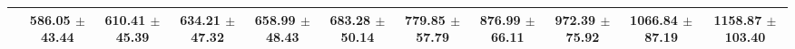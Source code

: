 {\begin{center}
\begin{small}
\begin{tabular}{ccccccccccc}
 & \textcolor{myred}{586.05 $\pm$ 43.44} & \textcolor{myred}{610.41 $\pm$ 45.39} & \textcolor{myred}{634.21 $\pm$ 47.32} & \textcolor{myred}{658.99 $\pm$ 48.43} & \textcolor{myred}{683.28 $\pm$ 50.14} & \textcolor{myred}{779.85 $\pm$ 57.79} & \textcolor{myred}{876.99 $\pm$ 66.11} & \textcolor{myred}{972.39 $\pm$ 75.92} & \textcolor{myred}{1066.84 $\pm$ 87.19} & \textcolor{myred}{1158.87 $\pm$ 103.40} \\
\hline\hline
\end{tabular}
\end{small}
\end{center}
}

